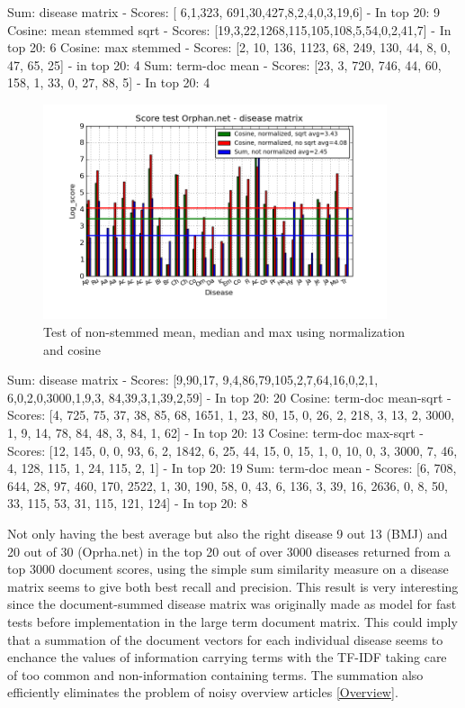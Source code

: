 Sum: disease matrix - Scores: [ 6,1,323, 691,30,427,8,2,4,0,3,19,6] - In top 20: 9
Cosine: mean stemmed sqrt - Scores: [19,3,22,1268,115,105,108,5,54,0,2,41,7] - In top 20: 6
Cosine: max stemmed - Scores: [2, 10, 136, 1123, 68, 249, 130, 44, 8, 0, 47, 65, 25] - in top 20: 4
Sum: term-doc mean - Scores: [23, 3, 720, 746, 44, 60, 158, 1, 33, 0, 27, 88, 5] - In top 20: 4

\begin{figure}[h!]
        \begin{center}
          \includegraphics[width=0.9\textwidth]{barcharts/diseaseMatrix_orphan_hist_NOTnorm_3000_s_cos_sqrt_cos_sum_nn.png}
        \end{center}
        \caption{Test of non-stemmed mean, median and max using normalization and cosine}
        \label{termDoc_orphan_hist_3000_sum_dm_mea_cos_sqrt_td_max_cos_sqrt_td_mea_sum_nn_td}
\end{figure}

Sum: disease matrix - Scores: [9,90,17, 9,4,86,79,105,2,7,64,16,0,2,1, 6,0,2,0,3000,1,9,3, 84,39,3,1,39,2,59] - In top 20: 20
Cosine: term-doc mean-sqrt - Scores: [4, 725, 75, 37, 38, 85, 68, 1651, 1, 23, 80, 15, 0, 26, 2, 218, 3, 13, 2, 3000, 1, 9, 14, 78, 84, 48, 3, 84, 1, 62] - In top 20: 13
Cosine: term-doc max-sqrt - Scores: [12, 145, 0, 0, 93, 6, 2, 1842, 6, 25, 44, 15, 0, 15, 1, 0, 10, 0, 3, 3000, 7, 46, 4, 128, 115, 1, 24, 115, 2, 1] - In top 20: 19
Sum: term-doc mean - Scores: [6, 708, 644, 28, 97, 460, 170, 2522, 1, 30, 190, 58, 0, 43, 6, 136, 3, 39, 16, 2636, 0, 8, 50, 33, 115, 53, 31, 115, 121, 124] - In top 20: 8

Not only having the best average but also the right disease 9 out 13 (BMJ) and 20 out of 30 (Oprha.net) in the top 20 out of over 3000 diseases returned from a top 3000 document scores, using the simple sum similarity measure on a disease matrix seems to give both best recall and precision. This result is very interesting since the document-summed disease matrix was originally made as model for fast tests before implementation in the large term document matrix. This could imply that a summation of the document vectors for each individual disease seems to enchance the values of information carrying terms with the TF-IDF taking care of too common and non-information containing terms. The summation also efficiently eliminates the problem of noisy overview articles \ref{Overview}. 

